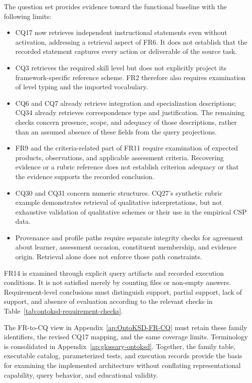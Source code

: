 The question set provides evidence toward the functional baseline with
the following limits:
\begin{itemize}
 \item CQ17 now retrieves independent instructional statements even
 without activation, addressing a retrieval aspect of FR6. It does not
 establish that the recorded statement captures every action or
 deliverable of the source task.
 \item CQ3 retrieves the required skill level but does not explicitly
 project its framework-specific reference scheme. FR2 therefore also
 requires examination of level typing and the imported vocabulary.
 \item CQ6 and CQ7 already retrieve integration and specialization
 descriptions; CQ34 already retrieves correspondence type and
 justification. The remaining checks concern presence, scope, and
 adequacy of those descriptions, rather than an assumed absence of
 these fields from the query projections.
 \item FR9 and the criteria-related part of FR11 require examination
 of expected products, observations, and applicable assessment criteria.
 Recovering evidence or a rubric reference does not establish criterion
 adequacy or that the evidence supports the recorded conclusion.
 \item CQ30 and CQ31 concern numeric structures. CQ27's synthetic
 rubric example demonstrates retrieval of qualitative interpretations,
 but not exhaustive validation of qualitative schemes or their use in
 the empirical CSP data.
 \item Provenance and profile paths require separate integrity checks
 for agreement about learner, assessment occasion, constituent
 membership, and evidence origin. Retrieval alone does not enforce
 those path constraints.
\end{itemize}

FR14 is examined through explicit query artifacts and recorded execution
conditions. It is not satisfied merely by counting files or non-empty
answers. Requirement-level conclusions must distinguish support,
partial support, lack of support, and absence of evaluation according
to the relevant checks in
Table~\ref{tab:ontoksd-requirement-checks}.

The FR-to-CQ view in Appendix~\ref{ap:OntoKSD-FR-CQ} must retain these
family identifiers, the revised CQ17 mapping, and the same coverage
limits. Terminology is consolidated in
Appendix~\ref{ap:glossary-ontoksd}. Together, the family table, executable
catalog, parameterized tests, and execution records provide the basis
for examining the implemented architecture without conflating
representational capability, query behavior, and educational validity.
